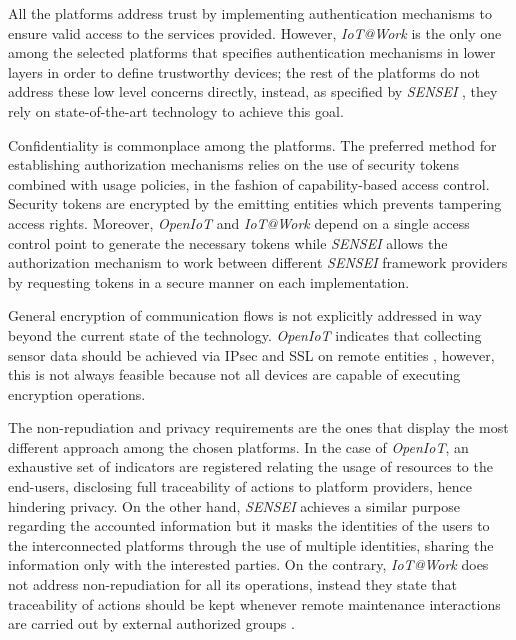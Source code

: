 \documentclass[journal]{IEEEtran}
\begin{document}
  All the platforms address trust by implementing authentication mechanisms to ensure valid access to the services provided. However, \emph{IoT@Work} is the only one among the selected platforms that specifies authentication mechanisms in lower layers in order to define trustworthy devices; the rest of the platforms do not address these low level concerns directly, instead, as specified by \emph{SENSEI} \cite{Bauge2010}, they rely on state-of-the-art technology to achieve this goal.

  Confidentiality is commonplace among the platforms. The preferred method for establishing authorization mechanisms relies on the use of security tokens combined with usage policies, in the fashion of capability-based access control. Security tokens are encrypted by the emitting entities which prevents tampering access rights. Moreover, \emph{OpenIoT} and \emph{IoT@Work} depend on a single access control point to generate the necessary tokens while \emph{SENSEI} allows the authorization mechanism to work between different \emph{SENSEI} framework providers by requesting tokens in a secure manner on each implementation.

  General encryption of communication flows is not explicitly addressed in way beyond the current state of the technology. \emph{OpenIoT} indicates that collecting sensor data should be achieved via IPsec and SSL on remote entities \cite{Dimitropoulus2012}, however, this is not always feasible because not all devices are capable of executing encryption operations.

  The non-repudiation and privacy requirements are the ones that display the most different approach among the chosen platforms. In the case of \emph{OpenIoT}, an exhaustive set of indicators are registered relating the usage of resources to the end-users, disclosing full traceability of actions to platform providers, hence hindering privacy. On the other hand, \emph{SENSEI} achieves a similar purpose regarding the accounted information but it masks the identities of the users to the interconnected platforms through the use of multiple identities, sharing the information only with the interested parties. On the contrary, \emph{IoT@Work} does not address non-repudiation for all its operations, instead they state that traceability of actions should be kept whenever remote maintenance interactions are carried out by external authorized groups \cite{Huth2010}.
  
\end{document}
